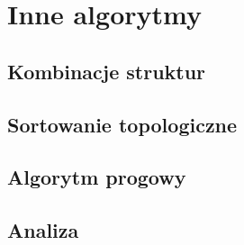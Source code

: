 \chapter{Inne algorytmy}


\section{Kombinacje struktur}


\subsection{}


\subsection{}


\section{Sortowanie topologiczne}


\section{Algorytm progowy}


\section{Analiza}

